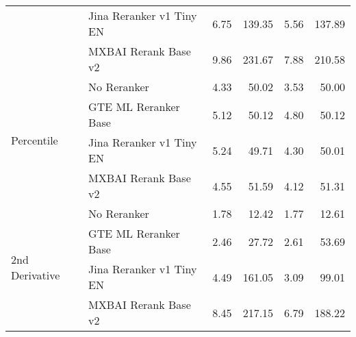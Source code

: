 \begin{table*}[htbp]
\begin{tabular}{llrrrr}
 & Jina Reranker v1 Tiny EN & 6.75 & 139.35 & 5.56 & 137.89 \\
 & MXBAI Rerank Base v2 & 9.86 & 231.67 & 7.88 & 210.58 \\
\cline{1-6}
\multirow[t]{4}{*}{Percentile} & No Reranker & 4.33 & 50.02 & 3.53 & 50.00 \\
 & GTE ML Reranker Base & 5.12 & 50.12 & 4.80 & 50.12 \\
 & Jina Reranker v1 Tiny EN & 5.24 & 49.71 & 4.30 & 50.01 \\
 & MXBAI Rerank Base v2 & 4.55 & 51.59 & 4.12 & 51.31 \\
\cline{1-6}
\multirow[t]{4}{*}{2nd Derivative} & No Reranker & 1.78 & 12.42 & 1.77 & 12.61 \\
 & GTE ML Reranker Base & 2.46 & 27.72 & 2.61 & 53.69 \\
 & Jina Reranker v1 Tiny EN & 4.49 & 161.05 & 3.09 & 99.01 \\
 & MXBAI Rerank Base v2 & 8.45 & 217.15 & 6.79 & 188.22 \\
\cline{1-6}
\bottomrule
\end{tabular}
\end{table*}

